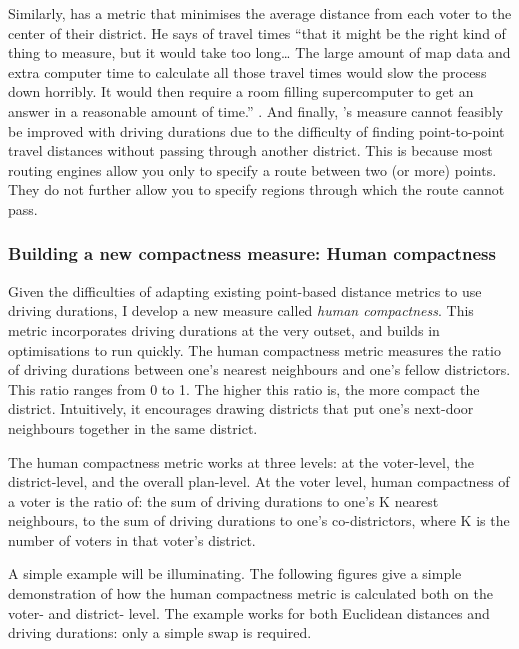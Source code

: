 \documentclass[]{article}
\begin{document}
Similarly, \citeauthor{olson2010} has a metric that minimises the
average distance from each voter to the center of their district. He
says of travel times ``that it might be the right kind of thing to
measure, but it would take too long\ldots{} The large amount of map data
and extra computer time to calculate all those travel times would slow
the process down horribly. It would then require a room filling
supercomputer to get an answer in a reasonable amount of time.''
\citep{olson2010}. And finally, \citeauthor{cm2010}'s measure cannot
feasibly be improved with driving durations due to the difficulty of
finding point-to-point travel distances without passing through another
district. This is because most routing engines allow you only to specify
a route between two (or more) points. They do not further allow you to
specify regions through which the route cannot pass.

\hypertarget{building-a-new-compactness-measure-human-compactness}{%
\subsubsection{Building a new compactness measure: Human
compactness}\label{building-a-new-compactness-measure-human-compactness}}

Given the difficulties of adapting existing point-based distance metrics
to use driving durations, I develop a new measure called \emph{human
compactness}. This metric incorporates driving durations at the very
outset, and builds in optimisations to run quickly. The human
compactness metric measures the ratio of driving durations between one's
nearest neighbours and one's fellow districtors. This ratio ranges from
0 to 1. The higher this ratio is, the more compact the district.
Intuitively, it encourages drawing districts that put one's next-door
neighbours together in the same district.

The human compactness metric works at three levels: at the voter-level,
the district-level, and the overall plan-level. At the voter level,
human compactness of a voter is the ratio of: the sum of driving
durations to one's K nearest neighbours, to the sum of driving durations
to one's co-districtors, where K is the number of voters in that voter's
district.

A simple example will be illuminating. The following figures give a
simple demonstration of how the human compactness metric is calculated
both on the voter- and district- level. The example works for both
Euclidean distances and driving durations: only a simple swap is
required.
\end{document}
